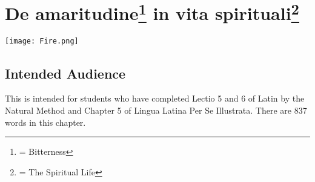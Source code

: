 \chapter{De amaritudine\footnote{\textbf{} = Bitterness} in vita spirituali\footnote{\textbf{} = The Spiritual Life}}
\begin{center}
\texttt{[image: Fire.png]}
\end{center}

\section{Intended Audience}
This is intended for students who have completed Lectio 5 and 6 of Latin by the Natural Method and Chapter 5 of Lingua Latina Per Se Illustrata. There are 837 words in this chapter.

